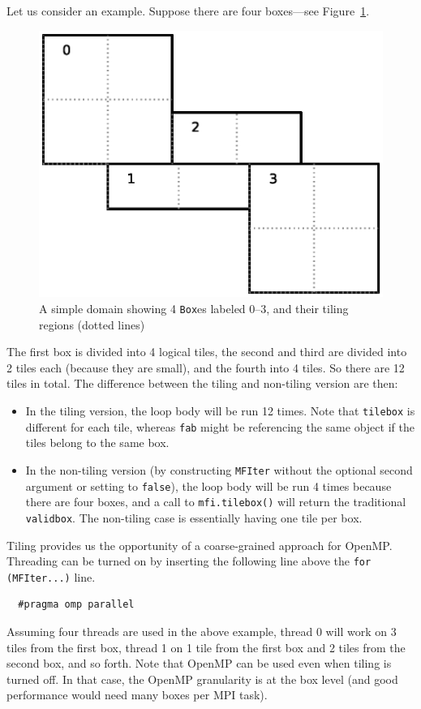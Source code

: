 Let us consider an example.  Suppose there are four boxes---see
Figure~\ref{fig:domain-tiling}.
\begin{figure}[t]
\centering
\includegraphics[width=0.8\linewidth]{domain-tile}
\caption{\label{fig:domain-tiling} A simple domain showing 4
  {\tt Box}es labeled 0--3, and their tiling regions (dotted lines)}
\end{figure}
%
The first box is divided into 4 logical tiles, the second and third
are divided into 2 tiles each (because they are small), and the fourth
into 4 tiles.  So there are 12 tiles in total.  The difference between
the tiling and non-tiling version are then:
\begin{itemize}
\item In the tiling version,
the loop body will be run 12 times.  Note that {\tt tilebox} is
different for each tile, whereas {\tt fab} might be referencing the
same object if the tiles belong to the same box.

\item In the non-tiling
version (by constructing {\tt MFIter} without the optional second
argument or setting to {\tt false}), the loop body will be run 4 times
because there are four boxes, and a call to {\tt mfi.tilebox()} will
return the traditional {\tt validbox}.  The non-tiling case is
essentially having one tile per box.
\end{itemize}
 
Tiling provides us the opportunity of a coarse-grained approach for
OpenMP.  Threading can be turned on by inserting the following line
above the {\tt for (MFIter...)} line.
\begin{lstlisting}
  #pragma omp parallel
\end{lstlisting}
Assuming four threads are used in the above example, thread 0 will
work on 3 tiles from the first box, thread 1 on 1 tile from the first
box and 2 tiles from the second box, and so forth.  Note that 
OpenMP can be used even when tiling is turned off.  In that case, the
OpenMP granularity is at the box level (and good performance would need
many boxes per MPI task).

